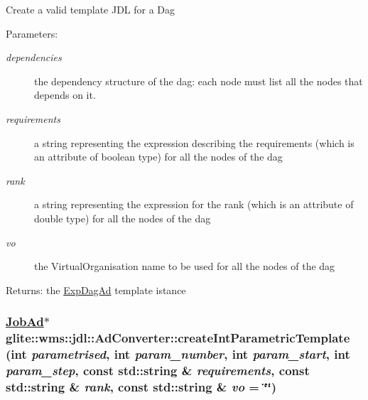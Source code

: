 Create a valid template JDL for a Dag \begin{Desc}
\item[Parameters:]
\begin{description}
\item[{\em dependencies}]the dependency structure of the dag: each node must list all the nodes that depends on it. \item[{\em requirements}]a string representing the expression describing the requirements (which is an attribute of boolean type) for all the nodes of the dag \item[{\em rank}]a string representing the expression for the rank (which is an attribute of double type) for all the nodes of the dag \item[{\em vo}]the Virtual\-Organisation name to be used for all the nodes of the dag \end{description}
\end{Desc}
\begin{Desc}
\item[Returns:]the \hyperlink{classglite_1_1wms_1_1jdl_1_1ExpDagAd}{Exp\-Dag\-Ad} template istance\end{Desc}
\hypertarget{classglite_1_1wms_1_1jdl_1_1AdConverter_z21_4}{
\subsubsection[createIntParametricTemplate]{\setlength{\rightskip}{0pt plus 5cm}\hyperlink{classglite_1_1wms_1_1jdl_1_1JobAd}{Job\-Ad}$\ast$ glite::wms::jdl::Ad\-Converter::create\-Int\-Parametric\-Template (int {\em parametrised}, int {\em param\_\-number}, int {\em param\_\-start}, int {\em param\_\-step}, const std::string \& {\em requirements}, const std::string \& {\em rank}, const std::string \& {\em vo} = \char`\"{}\char`\"{})}}
\label{classglite_1_1wms_1_1jdl_1_1AdConverter_z21_4}


